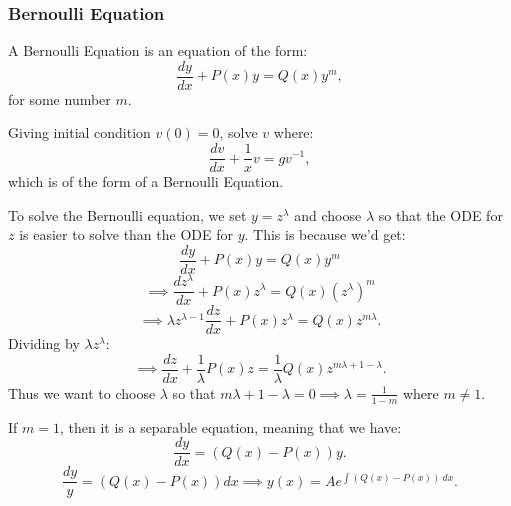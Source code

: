 \documentclass[../main/main.tex]{subfiles}
\begin{document}
\subsubsection{Bernoulli Equation}
\begin{definition}
	A Bernoulli Equation is an equation of the form: \[
		\frac{dy}{dx}+P(x)y=Q(x) y^{m}
	,\] for some number $m$. 
\end{definition}
\begin{example}
	Giving initial condition $v(0)=0$, solve  $v$ where: \[
	\frac{dv}{dx}+\frac{1}{x}v=gv^{-1}
	,\] which is of the form of a Bernoulli Equation. 
	
\end{example}

To solve the Bernoulli equation, we set $y=z^{\lambda}$ and choose $\lambda$ so that the ODE for $z$ is easier to solve than the ODE for $y$. This is because we'd get: \[
	\frac{dy}{dx}+P(x)y=Q(x) y^{m}
\] \[
\implies\frac{dz^{\lambda}}{dx}+P(x) z^{\lambda}=Q(x) (z^{\lambda})^{m}
\]\[
\implies \lambda z^{\lambda-1} \frac{dz}{dx} + P(x) z^{\lambda} = Q(x) z^{m\lambda}
.\] Dividing by $\lambda z^{\lambda}$: \[
\implies \frac{dz}{dx}+\frac{1}{\lambda}P(x) z = \frac{1}{\lambda}Q(x) z^{m\lambda+1-\lambda}
.\] Thus we want to choose $\lambda$ so that $m\lambda+1-\lambda=0 \implies \lambda = \frac{1}{1-m}$ where $m\neq 1$. 

If  $m=1$, then it is a separable equation, meaning that we have:  \[
	\frac{dy}{dx}=\left( Q(x)-P(x) \right) y
.\] \[
\frac{dy}{y } = \left( Q(x)-P(x) \right)dx \implies y(x) = Ae^{\int(Q(x)-P(x))~dx}
.\] 
\end{document}
